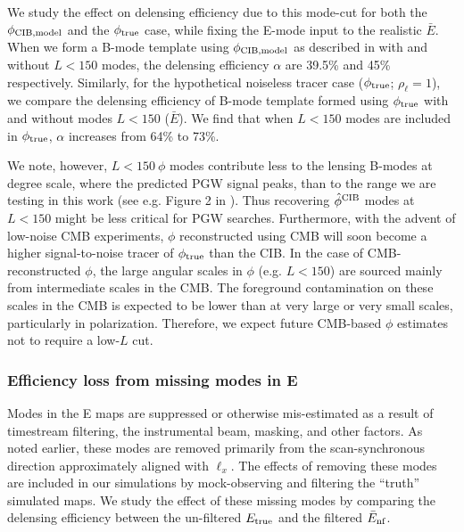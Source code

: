 We study the effect on delensing efficiency due to this mode-cut for both the $\phi_{\rm CIB, model}$ and the $\phi_{\rm true}$ case, while fixing the E-mode input to the realistic $\bar{E}$.
When we form a B-mode template using $\phi_{\rm CIB, model}$ as described in  with and without $L < 150$ modes,
the delensing efficiency $\alpha$ are 39.5\% and 45\% respectively.
Similarly, for the hypothetical noiseless tracer case ($\phi_{\rm true}$; $\rho_{\ell} = 1$), we compare the delensing efficiency of B-mode template formed using $\phi_{\rm true}$ with and without modes $L < 150$ ($\bar{E}$).
We find that when $L < 150$ modes are included in $\phi_{\rm true}$, $\alpha$ increases from 64\% to 73\%.

We note, however, $L < 150 ~ \phi$ modes contribute less to the lensing B-modes at degree scale, where the predicted PGW signal peaks, than to the range we are testing in this work (see e.g. Figure 2 in \citealt{simard:2015}).
Thus recovering $\hat{\phi}^{\rm{CIB}}$ modes at $L < 150$ might be less critical for PGW searches.
Furthermore, with the advent of low-noise CMB experiments, $\phi$ reconstructed using CMB will soon become a higher signal-to-noise tracer of $\phi_{\rm true}$ than the CIB.
In the case of CMB-reconstructed $\phi$, the large angular scales in $\phi$ (e.g. $L < 150$) are sourced mainly from intermediate scales in the CMB.
The foreground contamination on these scales in the CMB is expected to be lower than at very large or very small scales, particularly in polarization.
Therefore, we expect future CMB-based $\phi$ estimates not to require a low-$L$ cut.

\subsubsection{Efficiency loss from missing modes in E}
Modes in the E maps are suppressed or otherwise mis-estimated as a result of timestream filtering, the instrumental beam, masking, and other factors.
As noted earlier, these modes are removed primarily from the scan-synchronous direction approximately aligned with $\ell_x$.
The effects of removing these modes are included in our simulations by mock-observing and filtering the ``truth'' simulated maps.
We study the effect of these missing modes by comparing the delensing efficiency between the un-filtered $E_{\rm true}$ and the filtered $\bar{E}_{\rm nf}$.

